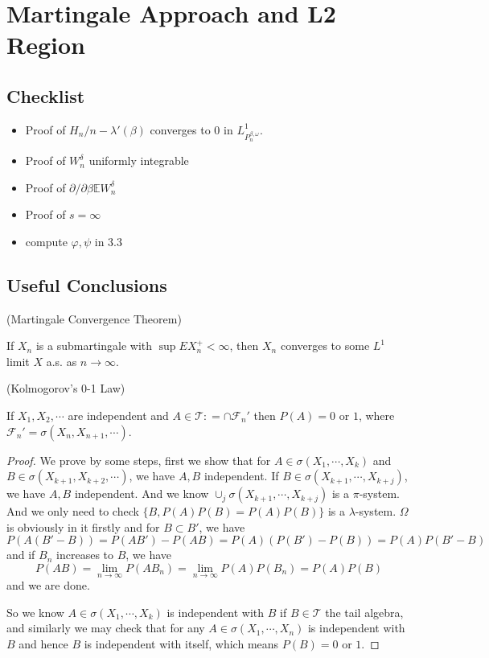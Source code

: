 \section{Martingale Approach and L2 Region}

\subsection{Checklist}

\begin{itemize}
    \item Proof of $H_n/n - \lambda'(\beta)$ converges to 0 in $L^1_{P_n^{\beta,\omega}}$.
    \item Proof of $W_n^{\delta}$ uniformly integrable
    \item Proof of $\partial/\partial \beta \mathbb{E}W_n^{\delta}$
    \item Proof of $s = \infty$
    \item compute $\varphi, \psi$ in 3.3
\end{itemize}

\subsection{Useful Conclusions}

\begin{theorem}
    (Martingale Convergence Theorem)\par
    If $X_n$ is a submartingale with $\sup EX_n^+ < \infty$, then $X_n$ converges to some $L^1$ limit $X$ a.s. as $n\to\infty$.
\end{theorem}

\begin{theorem}
    (Kolmogorov's 0-1 Law)\par
    If $X_1,X_2,\cdots$ are independent and $A \in \mathcal{T}: = \cap \mathcal{F}_n'$ then $P(A) = 0$ or $1$, where $\mathcal{F}_n' = \sigma(X_n, X_{n+1},\cdots)$.
\end{theorem}
\begin{proof}
    We prove by some steps, first we show that for $A \in \sigma(X_1,\cdots,X_k)$ and $B\in \sigma(X_{k+1},X_{k+2},\cdots)$, we have $A, B$ independent. If $B\in \sigma(X_{k+1},\cdots,X_{k+j})$, we have $A,B$ independent. And we know $\cup_j \sigma(X_{k+1},\cdots,X_{k+j})$ is a $\pi$-system. And we only need to check $\{B, P(A)P(B) = P(A)P(B)\}$ is a $\lambda$-system. $\Omega$ is obviously in it firstly and for $B\subset B'$, we have
    \[
    P(A(B'-B)) = P(AB')-P(AB) = P(A)(P(B')-P(B)) = P(A)P(B'-B)
    \]
    and if $B_n$ increases to $B$, we have
    \[
    P(AB) = \lim_{n\to\infty}P(AB_n) = \lim_{n\to\infty} P(A)P(B_n) = P(A)P(B)
    \]
    and we are done.\par
    So we know $A\in\sigma(X_1,\cdots,X_k)$ is independent with $B$ if $B \in \mathcal{T}$ the tail algebra, and similarly we may check that for any $A\in\sigma(X_1,\cdots,X_n)$ is independent with $B$ and hence $B$ is independent with itself, which means $P(B) = 0$ or $1$.\par  
\end{proof}

